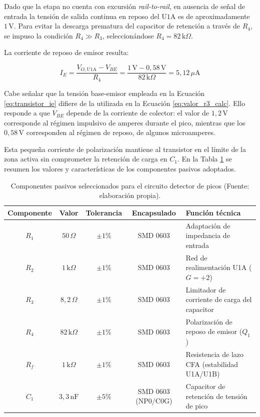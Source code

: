 Dado que la etapa no cuenta con excursión \emph{rail-to-rail}, en ausencia de señal de entrada la tensión de salida continua en reposo del $\text{U1A}$ es de aproximadamente $1\,\text{V}$. Para evitar la descarga prematura del capacitor de retención a través de $R_4$, se impuso la condición $R_4 \gg R_3$, seleccionándose $R_4 = 82\,\text{k}\Omega$.

La corriente de reposo de emisor resulta:

\begin{equation}
  I_E = \frac{V_{O,\text{U1A}} - V_{BE}}{R_4} = \frac{1\,\text{V} - 0{,}58\,\text{V}}{82\,\text{k}\Omega} = 5{,}12\,\mu\text{A}
  \label{eq:transistor_ie}
\end{equation}

Cabe señalar que la tensión base-emisor empleada en la Ecuación \ref{eq:transistor_ie} difiere de la utilizada en la Ecuación \ref{eq:valor_r3_calc}. Ello responde a que $V_{BE}$ depende de la corriente de colector: el valor de $1{,}2\,\text{V}$ corresponde al régimen impulsivo de amperes durante el pico, mientras que los $0{,}58\,\text{V}$ corresponden al régimen de reposo, de algunos microamperes.

Esta pequeña corriente de polarización mantiene al transistor en el límite de la zona activa sin comprometer la retención de carga en $C_1$. En la Tabla \ref{tab:componentes_pasivos} se resumen los valores y características de los componentes pasivos adoptados.

\begin{table}[h]
  \centering
  \begin{tabular}{c c c c l}
    \toprule
    \textbf{Componente} & \textbf{Valor} & \textbf{Tolerancia} & \textbf{Encapsulado} & \textbf{Función técnica} \\
    \midrule
    $R_1$ & $50\,\Omega$ & $\pm 1\%$ & SMD 0603 & Adaptación de impedancia de entrada \\
    $R_2$ & $1\,\text{k}\Omega$ & $\pm 1\%$ & SMD 0603 & Red de realimentación U1A ($G=+2$) \\
    $R_3$ & $8{,}2\,\Omega$ & $\pm 1\%$ & SMD 0603 & Limitador de corriente de carga del capacitor \\
    $R_4$ & $82\,\text{k}\Omega$ & $\pm 1\%$ & SMD 0603 & Polarización de reposo de emisor ($Q_1$) \\
    $R_f$ & $1\,\text{k}\Omega$ & $\pm 1\%$ & SMD 0603 & Resistencia de lazo CFA (estabilidad U1A/U1B) \\
    $C_1$ & $3{,}3\,\text{nF}$ & $\pm 5\%$ & SMD 0603 (NP0/C0G) & Capacitor de retención de tensión de pico \\
    \bottomrule
  \end{tabular}
  \caption{Componentes pasivos seleccionados para el circuito detector de picos (Fuente: elaboración propia).}
  \label{tab:componentes_pasivos}
\end{table}

